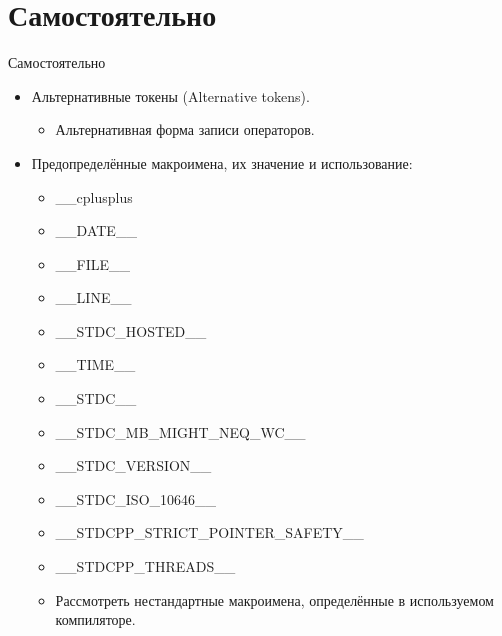     \section{Самостоятельно}
    \begin{frame}{Самостоятельно}
        \begin{itemize}
            \item Альтернативные токены (Alternative tokens).
                \begin{itemize}
                    \item Альтернативная форма записи операторов.
                \end{itemize}
            \item Предопределённые макроимена, их значение и использование:
                \begin{itemize}
                    \item \_\_cplusplus
                    \item \_\_DATE\_\_
                    \item \_\_FILE\_\_
                    \item \_\_LINE\_\_
                    \item \_\_STDC\_HOSTED\_\_
                    \item \_\_TIME\_\_
                    \item \_\_STDC\_\_
                    \item \_\_STDC\_MB\_MIGHT\_NEQ\_WC\_\_
                    \item \_\_STDC\_VERSION\_\_
                    \item \_\_STDC\_ISO\_10646\_\_
                    \item \_\_STDCPP\_STRICT\_POINTER\_SAFETY\_\_
                    \item \_\_STDCPP\_THREADS\_\_
                    \item Рассмотреть нестандартные макроимена, определённые в используемом компиляторе.
                \end{itemize}
        \end{itemize}
    \end{frame}

